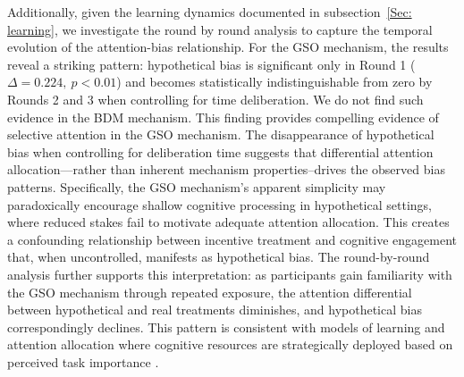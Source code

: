 \documentclass[12pt]{article}
\begin{document}
Additionally, given the learning dynamics documented in subsection~\ref{Sec: learning}, we investigate the round by round analysis to capture the temporal evolution of the attention-bias relationship. For the GSO mechanism, the results reveal a striking pattern: hypothetical bias is significant only in Round 1 (\(\Delta = 0.224, \ p < 0.01\)) and becomes statistically indistinguishable from zero by Rounds 2 and 3 when controlling for time deliberation. We do not find such evidence in the BDM mechanism.
This finding provides compelling evidence of  selective attention in the GSO mechanism. The disappearance of hypothetical bias when controlling for deliberation time suggests that differential attention allocation—rather than inherent mechanism properties--drives the observed bias patterns. Specifically, the GSO mechanism's apparent simplicity may paradoxically encourage shallow cognitive processing in hypothetical settings, where reduced stakes fail to motivate adequate attention allocation. This creates a confounding relationship between incentive treatment and cognitive engagement that, when uncontrolled, manifests as hypothetical bias.
The round-by-round analysis further supports this interpretation: as participants gain familiarity with the GSO mechanism through repeated exposure, the attention differential between hypothetical and real treatments diminishes, and hypothetical bias correspondingly declines. This pattern is consistent with models of learning and attention allocation where cognitive resources are strategically deployed based on perceived task importance \citep{gabaix2019behavioral}.
\end{document}
